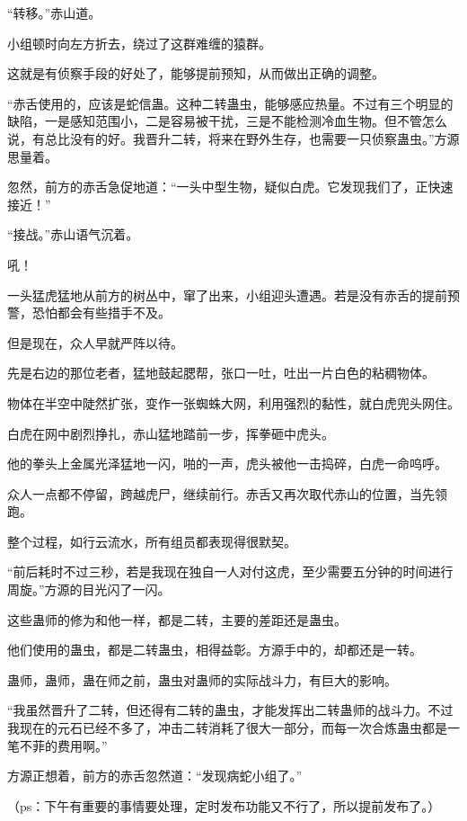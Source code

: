 \begin{this_body}
“转移。”赤山道。

小组顿时向左方折去，绕过了这群难缠的猿群。

这就是有侦察手段的好处了，能够提前预知，从而做出正确的调整。

“赤舌使用的，应该是蛇信蛊。这种二转蛊虫，能够感应热量。不过有三个明显的缺陷，一是感知范围小，二是容易被干扰，三是不能检测冷血生物。但不管怎么说，有总比没有的好。我晋升二转，将来在野外生存，也需要一只侦察蛊虫。”方源思量着。

忽然，前方的赤舌急促地道：“一头中型生物，疑似白虎。它发现我们了，正快速接近！”

“接战。”赤山语气沉着。

吼！

一头猛虎猛地从前方的树丛中，窜了出来，小组迎头遭遇。若是没有赤舌的提前预警，恐怕都会有些措手不及。

但是现在，众人早就严阵以待。

先是右边的那位老者，猛地鼓起腮帮，张口一吐，吐出一片白色的粘稠物体。

物体在半空中陡然扩张，变作一张蜘蛛大网，利用强烈的黏性，就白虎兜头网住。

白虎在网中剧烈挣扎，赤山猛地踏前一步，挥拳砸中虎头。

他的拳头上金属光泽猛地一闪，啪的一声，虎头被他一击捣碎，白虎一命呜呼。

众人一点都不停留，跨越虎尸，继续前行。赤舌又再次取代赤山的位置，当先领跑。

整个过程，如行云流水，所有组员都表现得很默契。

“前后耗时不过三秒，若是我现在独自一人对付这虎，至少需要五分钟的时间进行周旋。”方源的目光闪了一闪。

这些蛊师的修为和他一样，都是二转，主要的差距还是蛊虫。

他们使用的蛊虫，都是二转蛊虫，相得益彰。方源手中的，却都还是一转。

蛊师，蛊师，蛊在师之前，蛊虫对蛊师的实际战斗力，有巨大的影响。

“我虽然晋升了二转，但还得有二转的蛊虫，才能发挥出二转蛊师的战斗力。不过我现在的元石已经不多了，冲击二转消耗了很大一部分，而每一次合炼蛊虫都是一笔不菲的费用啊。”

方源正想着，前方的赤舌忽然道：“发现病蛇小组了。”

（ps：下午有重要的事情要处理，定时发布功能又不行了，所以提前发布了。）

\end{this_body}

